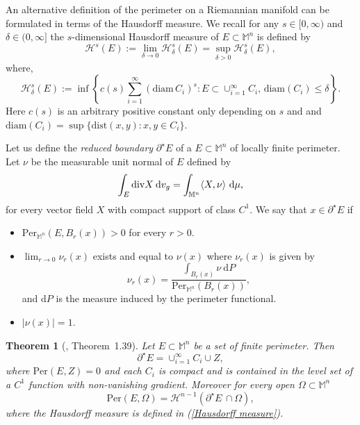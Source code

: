\documentclass[a4paper,11pt,reqno]{amsart}
\renewcommand\eqref[1]{(\ref{#1})}
\theoremstyle{plain}
\newtheorem{theorem}{Theorem}[section]
\numberwithin{equation}{section} \allowdisplaybreaks
\newcommand{\dvg}{\: {\rm d}v_{g}}
\newcommand{\m}{\mathbb{M}^n}
\begin{document}
 An alternative definition of the perimeter on a Riemannian manifold can be formulated in terms of the Hausdorff measure. We recall for any $s \in [0,\infty)$ and $\delta \in (0,\infty]$ the $s$-dimensional Hausdorff measure of $E\subset \m$ is defined by
\begin{equation}\label{Hausdorff measure}
    \mathcal{H}^s(E):=\lim_{\delta\to 0}\mathcal{H}_{\delta}^s(E)=\sup_{\delta>0}\mathcal{H}_{\delta}^s(E),
\end{equation}
where,
\begin{equation*}
    \mathcal{H}_{\delta}^s(E):= \inf\left\{c(s)\sum_{i=1}^{\infty} (\text{diam}\,C_i)^s: E\subset \cup_{i=1}^{\infty} C_i, \,\text{diam}(C_i) \leq \delta\right\}.
\end{equation*}
Here $c(s)$ is an arbitrary positive constant only depending on $s$ and and $\text{diam}(C_i)=\sup\{\text{dist}(x,y): x,y \in C_i\}$.\par
Let us define the \textit{reduced boundary} $\partial^\star E$ of a $E\subset \m$ of locally finite perimeter. Let $\nu$ be the measurable unit normal of $E$ defined by 
\begin{equation*}
    \int_E \text{div}X\dvg=\int_{\m}\langle X,\nu\rangle\ \mathrm{d}\mu,
\end{equation*}
for every vector field $X$ with compact support of class $C^1$. 
We say that $x\in \partial^\star E$ if
\begin{itemize}
    \item[(i)] $\text{Per}_{\m}(E,B_r(x))>0$ for every $r>0.$
    \medskip 
    \item[(ii)] $\lim_{r \to 0}\nu_r(x)$ exists and equal to $\nu(x)$ where $\nu_r(x)$ is given by 
    \begin{equation*}
        \nu_r(x)=\frac{\int_{B_r(x)}\nu \ \mathrm{d}P}{\text{Per}_{\m}(B_r(x))},
    \end{equation*}
    and $\mathrm{d}P$ is the measure induced by the perimeter functional.
    \medskip
    \item[(iii)] $|\nu(x)|=1$.
\end{itemize}
\begin{theorem}[\cite{Ritore}, Theorem~1.39]
    Let $E\subset \m$ be a set of finite perimeter. Then
    \begin{equation*}
        \partial^\star E= \cup_{i=1}^\infty C_i \cup Z,
    \end{equation*}
    where $\mathrm{Per}(E,Z)=0$ and each $C_i$ is compact and is contained in the level set of a $C^1$ function with non-vanishing gradient. Moreover for every open $\Omega \subset \m$
    \begin{equation*}
        \mathrm{Per}(E,\Omega)= \mathcal{H}^{n-1}(\partial^\star E\, \cap \Omega),
    \end{equation*}
    where the Hausdorff measure is defined in \eqref{Hausdorff measure}.
\end{theorem}
\end{document}
